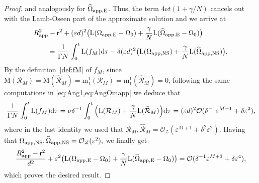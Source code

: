 \documentclass[11pt,reqno,a4paper]{amsart}
\def\dd{{\rm d}}
\def\eps{\varepsilon}
\newcommand{\cO}{\mathcal{O}}
\newcommand{\cR}{\mathcal{R}}
\newcommand{\cZ}{\mathcal{Z}}
\newcommand{\mrm}{\mathrm{m}}
\newcommand{\mrM}{\mathrm{M}}
\newcommand{\1}{\mathbbm{1}}
\theoremstyle{definition}
\theoremstyle{definition}
\numberwithin{equation}{section}
\begin{document}
\begin{proof}
and analogously for $\widehat{\Omega}_{\rm app,E}$.
Thus, the term $4\nu t(1+\gamma/N)$ cancels out with the Lamb-Oseen part of the approximate solution and  we  arrive at 
\begin{align}
    &R_{\rm app}^2-\mathsf{r}^2+(\eps d)^2\big(\mathrm{L}(\Omega_{\rm app,E}-\Omega_0)+\frac{\gamma}{N}\mathrm{L}(\widehat{\Omega}_{\rm app,E}-\Omega_0)\big)\\
    &\qquad=\frac{1}{\Gamma N}\int_0^t\mathrm{L}(f_M)\dd \tau -\delta(\eps d)^2\big(\mathrm{L}( \Omega_{\rm app,NS})+\frac{\gamma}{N}\mathrm{L}( \widehat{\Omega}_{\rm app,NS})\big).
\end{align}
By the definition~\cref{def:fM} of $f_M$, since $\mrM(\cR_{M})=\mrM(\widehat{\cR}_{M})=\mrm_1^1(\cR_{M})=\mrm_1^1(\widehat{\cR}_{M})=0$, following the same computations in \cref{eq:Ang1,eq:AngOmapp} we deduce that 
\begin{align}
    \frac{1}{\Gamma N}\int_0^t\mathrm{L}(f_M)\dd \tau =\nu\delta^{-1}\int_0^t\Big(\mathrm{L}(\cR_M)+\frac{\gamma}{N}\mathrm{L}(\widehat{\cR}_M)\Big)\dd \tau=(\eps d)^2\cO(\delta^{-1}\eps^{M+1}+\delta \eps^2),
\end{align}
where in the last identity we used that $\cR_M,\widehat{\cR}_M=\cO_{\cZ}(\eps^{M+1}+\delta^2\eps^2).$ Having that $\Omega_{\rm app, NS},\widehat{\Omega}_{\rm app,NS}=\cO_{\cZ}(\eps^2),$ we finally get
\begin{align}
    \frac{R_{\rm app}^2-\mathsf{r}^2}{d^2}+\eps^2 \big(\mathrm{L}(\Omega_{\rm app,E}-\Omega_0)+\frac{\gamma}{N}\mathrm{L}(\widehat{\Omega}_{\rm app,E}-\Omega_0)\big)=\cO(\delta^{-1}\eps^{M+3}+\delta \eps^4),
\end{align}
which proves the desired result.
\end{proof}
\end{document}
